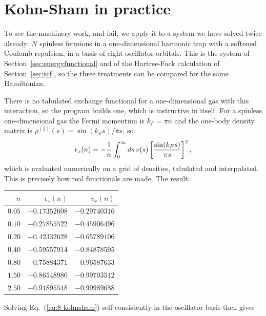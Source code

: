 \section{Kohn-Sham in practice}
\label{sec:kspractice}

To see the machinery work, and fail, we apply it to a system we have solved
twice already: $N$ spinless fermions in a one-dimensional harmonic trap with
a softened Coulomb repulsion, in a basis of eight oscillator orbitals.  This
is the system of Section~\ref{sec:energyfunctional} and of the Hartree-Fock
calculation of Section~\ref{sec:scf}, so the three treatments can be compared
for the same Hamiltonian.

There is no tabulated exchange functional for a one-dimensional gas with this
interaction, so the program builds one, which is instructive in itself.  For a
spinless one-dimensional gas the Fermi momentum is $k_F=\pi n$ and the
one-body density matrix is $\rho^{(1)}(s)=\sin(k_Fs)/\pi s$, so
\begin{equation}
  \epsilon_x(n) = -\frac{1}{n}\int_0^{\infty}ds\,v(s)
    \left[\frac{\sin(k_F s)}{\pi s}\right]^2 ,
  \label{eq:8-lda1d}
\end{equation}
which is evaluated numerically on a grid of densities, tabulated and
interpolated.  This is precisely how real functionals are made.  The result:

\begin{center}
\renewcommand{\arraystretch}{1.2}
\setlength{\tabcolsep}{11pt}
\begin{tabular}{rrr}
\toprule
$n$ & $\epsilon_x(n)$ & $v_x(n)$\\
\midrule
$0.05$ & $-0.17352608$ & $-0.29740316$\\
$0.10$ & $-0.27855522$ & $-0.45906496$\\
$0.20$ & $-0.42332628$ & $-0.65789106$\\
$0.40$ & $-0.59557914$ & $-0.84878595$\\
$0.80$ & $-0.75884371$ & $-0.96587633$\\
$1.50$ & $-0.86548980$ & $-0.99703512$\\
$2.50$ & $-0.91895548$ & $-0.99989688$\\
\bottomrule
\end{tabular}
\end{center}

Solving Eq.~(\ref{eq:8-kohnsham}) self-consistently in the oscillator basis
then gives

